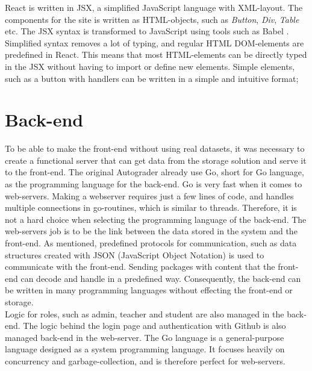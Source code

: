 React is written in JSX, a simplified JavaScript language with XML-layout. The components for the site is written as HTML-objects, such as \emph{Button}, \emph{Div}, \emph{Table} etc. The JSX syntax is transformed to JavaScript using tools such as Babel . Simplified syntax removes a lot of typing, and regular HTML DOM-elements are predefined in React. This means that most HTML-elements can be directly typed in the JSX without having to import or define new elements. Simple elements, such as a button with handlers can be written in a simple and intuitive format;



\section{Back-end}
To be able to make the front-end without using real datasets, it was necessary to create a functional server that can get data from the storage solution and serve it to the front-end. The original Autograder already use Go, short for Go language, as the programming language for the back-end. Go is very fast when it comes to web-servers. Making a webserver requires just a few lines of code, and handles multiple connections in go-routines, which is similar to threads. Therefore, it is not a hard choice when selecting the programming language of the back-end. The web-servers job is to be the link between the data stored in the system and the front-end. As mentioned, predefined protocols for communication, such as data structures created with JSON (JavaScript Object Notation) is used to communicate with the front-end. Sending packages with content that the front-end can decode and handle in a predefined way. Consequently, the back-end can be written in many programming languages without effecting the front-end or storage. \\Logic for roles, such as admin, teacher and student are also managed in the back-end. The logic behind the login page and authentication with Github is also managed back-end in the web-server. The Go language is a general-purpose language designed as a system programming language. It focuses heavily on concurrency and garbage-collection, and is therefore perfect for web-servers.

